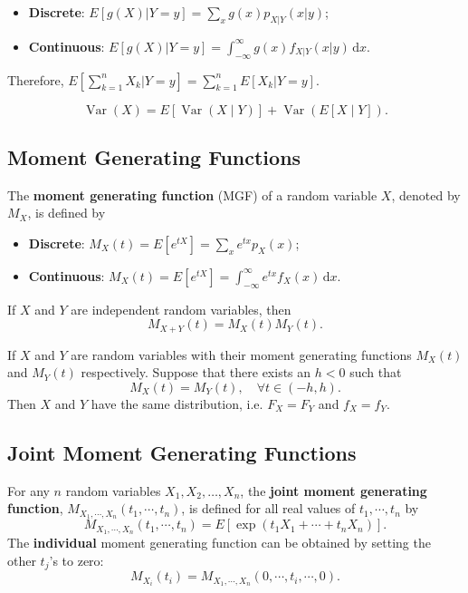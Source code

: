 \begin{itemize}
  \item \textbf{Discrete}: \(E[g(X)|Y=y] = \sum_x g(x)p_{X|Y}(x|y)\);
  \item \textbf{Continuous}: \(E[g(X)|Y=y] = \int_{-\infty}^{\infty}
    g(x)f_{X|Y}(x|y)\,\mathrm{d}x\).
\end{itemize}
Therefore, \(E\left[\sum\limits_{k=1}^{n}X_k | Y=y\right] =
\sum\limits_{k=1}^{n}E[X_k|Y = y]\).

\[\operatorname{Var}\left(X\right)=E\left[\operatorname{Var}\left(X\mid
Y\right)\right]+\operatorname{Var}\left(E\left[X\mid Y\right]\right).\]

\subsection{Moment Generating Functions}

 The \textbf{moment generating function} (MGF) of a
random variable \(X\), denoted by \(M_X\), is defined by
\begin{itemize}
  \item \textbf{Discrete}: \(M_X(t) = E[e^{tX}] = \sum_x e^{tx}p_X(x)\);
  \item \textbf{Continuous}: \(M_X(t) = E[e^{tX}] = \int_{-\infty}^{\infty}
    e^{tx}f_X(x)\,\mathrm{d}x\).
\end{itemize}

 If \(X\) and \(Y\) are
independent random variables, then
\[M_{X+Y}(t) = M_X(t)M_Y(t).\]

 If \(X\) and \(Y\) are random
variables with their moment generating functions \(M_X(t)\) and \(M_Y(t)\)
respectively. Suppose that there exists an \(h < 0\) such that 
\[M_X(t) = M_Y(t), \quad \forall t \in (-h, h).\]
Then \(X\) and \(Y\) have the same distribution, i.e. \(F_X = F_Y\) and 
\(f_X = f_Y\).


\subsection{Joint Moment Generating Functions}

For any \(n\) random variables \(X_1, X_2, \ldots, X_n\), the \textbf{joint
moment generating function}, \(M_{X_1, \cdots, X_n}(t_1, \cdots, t_n)\), is
defined for all real values of \(t_1, \cdots, t_n\) by
\[M_{X_1, \cdots, X_n}(t_1, \cdots, t_n) = E\left[\exp({t_1X_1 + \cdots +
t_nX_n})\right].\]
The \textbf{individual} moment generating function can be obtained by
setting the other \(t_j\)'s to zero:
\[M_{X_i}(t_i) = M_{X_1, \cdots, X_n}(0, \cdots, t_i, \cdots, 0).\]

